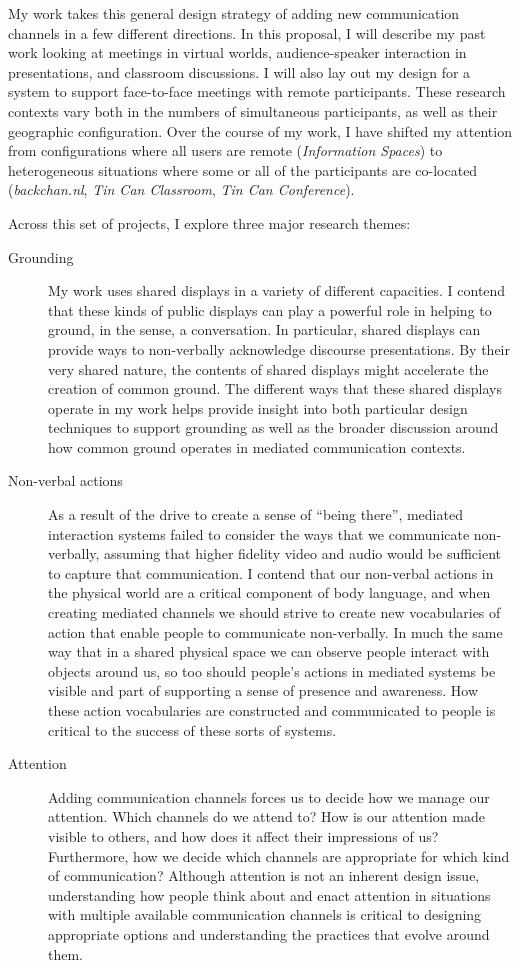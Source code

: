 My work takes this general design strategy of adding new communication channels in a few different directions. In this proposal, I will describe my past work looking at meetings in virtual worlds, audience-speaker interaction in presentations, and classroom discussions. I will also lay out my design for a system to support face-to-face meetings with remote participants. These research contexts vary both in the numbers of simultaneous participants, as well as their geographic configuration. Over the course of my work, I have shifted my attention from configurations where all users are remote (\emph{Information Spaces}) to heterogeneous situations where some or all of the participants are co-located (\emph{backchan.nl}, \emph{Tin Can Classroom}, \emph{Tin Can Conference}). 

Across this set of projects, I explore three major research themes:

\begin{description}
	\item[Grounding]{My work uses shared displays in a variety of different capacities. I contend that these kinds of public displays can play a powerful role in helping to ground, in the \citet{Clark:1989uc} sense, a conversation. In particular, shared displays can provide ways to non-verbally acknowledge discourse presentations. By their very shared nature, the contents of shared displays might accelerate the creation of common ground. The different ways that these shared displays operate in my work helps provide insight into both particular design techniques to support grounding as well as the broader discussion around how common ground operates in mediated communication contexts.}
	\item[Non-verbal actions]{As a result of the drive to create a sense of ``being there'', mediated interaction systems failed to consider the ways that we communicate non-verbally, assuming that higher fidelity video and audio would be sufficient to capture that communication. I contend that our non-verbal actions in the physical world are a critical component of body language, and when creating mediated channels we should strive to create new vocabularies of action that enable people to communicate non-verbally. In much the same way that in a shared physical space we can observe people interact with objects around us, so too should people's actions in mediated systems be visible and part of supporting a sense of presence and awareness. How these action vocabularies are constructed and communicated to people is critical to the success of these sorts of systems.}
	\item[Attention]{Adding communication channels forces us to decide how we manage our attention. Which channels do we attend to? How is our attention made visible to others, and how does it affect their impressions of us? Furthermore, how we decide which channels are appropriate for which kind of communication? Although attention is not an inherent design issue, understanding how people think about and enact attention in situations with multiple available communication channels is critical to designing appropriate options and understanding the practices that evolve around them.}
\end{description}

